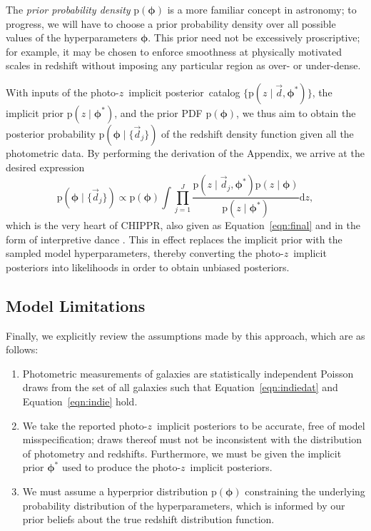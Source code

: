 \documentclass[iop]{emulateapj}
\newcommand{\Eq}[1]{Equation~\ref{#1}}
\newcommand{\project}[1]{\textsc{#1}}
\newcommand{\Chippr}{\project{CHIPPR}}
\newcommand{\data}{\ensuremath{\vec{d}}}
\newcommand{\pr}[1]{\ensuremath{\mathrm{p}(#1)}}
\newcommand{\gvn}{\mid}
\newcommand{\integral}[2]{\ensuremath{\int #1 \mathrm{d} #2}}
\newcommand{\pz}{photo-$z$}
\newcommand{\pzip}{\pz\ implicit posterior}
\newcommand{\bvec}[1]{\ensuremath{\boldsymbol{#1}}}
\newcommand{\ndphi}{\bvec{\phi}}
\begin{document}
The \textit{prior probability density} $\pr{\ndphi}$ is a more familiar concept in astronomy; 
to progress, we will have to choose a prior probability density over all possible values of the hyperparameters $\ndphi$.
This prior need not be excessively proscriptive; 
for example, it may be chosen to enforce smoothness at physically motivated scales in redshift without imposing any particular region as over- or under-dense.

With inputs of the \pzip\ catalog $\{\pr{z \gvn \data, \ndphi^{*}}\}$, the implicit prior $\pr{z \gvn \ndphi^{*}}$, and the prior PDF $\pr{\ndphi}$, we thus aim to obtain the posterior probability $\pr{\ndphi \gvn \{\data_{j}\}}$ of the redshift density function given all the photometric data.
By performing the derivation of the Appendix, we arrive at the desired expression
\begin{equation}
\label{eqn:fullpost}
\pr{\ndphi \gvn \{\data_{j}\}} \propto \pr{\ndphi} \integral{\prod_{j=1}^{J} \frac{\pr{z \gvn \data_{j}, \ndphi^{*}} \pr{z \gvn \ndphi}}{\pr{z \gvn \ndphi^{*}}}}{z},
\end{equation}
which is the very heart of \Chippr, also given as \Eq{eqn:final} and in the form of interpretive dance \citep{malz_probabilistic_2019}.
This in effect replaces the implicit prior with the sampled model hyperparameters, thereby converting the \pzip s into likelihoods in order to obtain unbiased posteriors.

\subsection{Model Limitations}
\label{sec:limitations}

Finally, we explicitly review the assumptions made by this approach, which are as follows:
\begin{enumerate}
	\item Photometric measurements of galaxies are statistically independent Poisson draws from the set of all galaxies such that \Eq{eqn:indiedat} and \Eq{eqn:indie} hold.
	\item We take the reported \pzip s to be accurate, free of model misspecification; 
	draws thereof must not be inconsistent with the distribution of photometry and redshifts.
	Furthermore, we must be given the implicit prior $\ndphi^{*}$ used to produce the \pzip s.
	\item We must assume a hyperprior distribution $\pr{\ndphi}$ constraining the underlying probability distribution of the hyperparameters, which is informed by our prior beliefs about the true redshift distribution function.
\end{enumerate}
\end{document}
